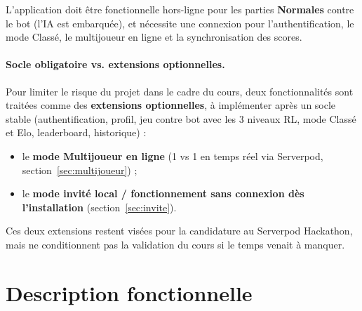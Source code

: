 \documentclass[a4paper,11pt]{article}
\begin{document}
L'application doit être fonctionnelle hors-ligne pour les parties \textbf{Normales}
contre le bot (l'IA est embarquée), et nécessite une connexion pour
l'authentification, le mode Classé, le multijoueur en ligne et la synchronisation
des scores.

\paragraph{Socle obligatoire vs. extensions optionnelles.} Pour limiter le risque
du projet dans le cadre du cours, deux fonctionnalités sont traitées comme des
\textbf{extensions optionnelles}, à implémenter après un socle stable
(authentification, profil, jeu contre bot avec les 3 niveaux RL, mode Classé et Elo,
leaderboard, historique) :
\begin{itemize}[leftmargin=1.5em]
  \item le \textbf{mode Multijoueur en ligne} (1 vs 1 en temps réel via Serverpod,
        section~\ref{sec:multijoueur}) ;
  \item le \textbf{mode invité local / fonctionnement sans connexion dès
        l'installation} (section~\ref{sec:invite}).
\end{itemize}
Ces deux extensions restent visées pour la candidature au Serverpod Hackathon, mais
ne conditionnent pas la validation du cours si le temps venait à manquer.

\section{Description fonctionnelle}
\end{document}
